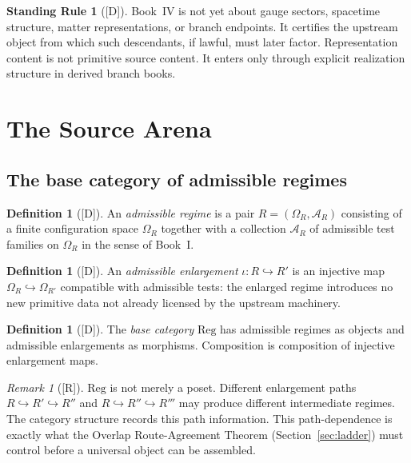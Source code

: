 \documentclass[12pt,oneside]{amsbook}
\theoremstyle{plain}
\theoremstyle{definition}
\newtheorem{definition}[theorem]{Definition}
\newtheorem{standingrule}[theorem]{Standing Rule}
\theoremstyle{remark}
\newtheorem{remark}[theorem]{Remark}
\newcommand{\status}[1]{\textup{[#1]}}
\begin{document}
\begin{standingrule}[\status{D}]\label{sr:source-not-branch}
Book~IV is not yet about gauge sectors, spacetime structure, matter
representations, or branch endpoints.  It certifies the upstream
object from which such descendants, if lawful, must later factor.
Representation content is not primitive source content.  It enters
only through explicit realization structure in derived branch books.
\end{standingrule}

\section{The Source Arena}

\subsection*{The base category of admissible regimes}

\begin{definition}[\status{D}]\label{def:Reg-regime}
An \emph{admissible regime} is a pair $R = (\Omega_R, \mathcal{A}_R)$
consisting of a finite configuration space $\Omega_R$ together with a
collection $\mathcal{A}_R$ of admissible test families on $\Omega_R$
in the sense of Book~I.
\end{definition}

\begin{definition}[\status{D}]\label{def:Reg-enlargement}
An \emph{admissible enlargement} $\iota: R \hookrightarrow R'$ is an
injective map $\Omega_R \hookrightarrow \Omega_{R'}$ compatible with
admissible tests: the enlarged regime introduces no new primitive data
not already licensed by the upstream machinery.
\end{definition}

\begin{definition}[\status{D}]\label{def:Reg}
The \emph{base category} $\mathrm{Reg}$ has admissible regimes as
objects and admissible enlargements as morphisms.  Composition is
composition of injective enlargement maps.
\end{definition}

\begin{remark}[\status{R}]\label{rmk:Reg-not-poset}
$\mathrm{Reg}$ is not merely a poset.  Different enlargement paths
$R \hookrightarrow R' \hookrightarrow R''$ and $R \hookrightarrow R''
\hookrightarrow R'''$ may produce different intermediate regimes.  The
category structure records this path information.  This path-dependence
is exactly what the Overlap Route-Agreement Theorem (Section~\ref{sec:ladder})
must control before a universal object can be assembled.
\end{remark}
\end{document}
